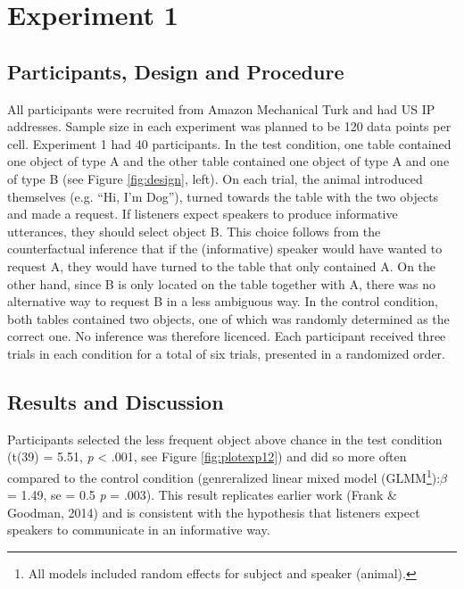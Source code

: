 \documentclass[10pt, letterpaper]{article}
\begin{document}
\section{Experiment 1}\label{experiment-1}

\subsection{Participants, Design and
Procedure}\label{participants-design-and-procedure}

All participants were recruited from Amazon Mechanical Turk and had US
IP addresses. Sample size in each experiment was planned to be 120 data
points per cell. Experiment 1 had 40 participants. In the test
condition, one table contained one object of type A and the other table
contained one object of type A and one of type B (see Figure
\ref{fig:design}, left). On each trial, the animal introduced themselves
(e.g. ``Hi, I'm Dog''), turned towards the table with the two objects
and made a request. If listeners expect speakers to produce informative
utterances, they should select object B. This choice follows from the
counterfactual inference that if the (informative) speaker would have
wanted to request A, they would have turned to the table that only
contained A. On the other hand, since B is only located on the table
together with A, there was no alternative way to request B in a less
ambiguous way. In the control condition, both tables contained two
objects, one of which was randomly determined as the correct one. No
inference was therefore licenced. Each participant received three trials
in each condition for a total of six trials, presented in a randomized
order.

\subsection{Results and Discussion}\label{results-and-discussion}

Participants selected the less frequent object above chance in the test
condition (t(39) = 5.51, \emph{p} \textless{} .001, see Figure
\ref{fig:plotexp12}) and did so more often compared to the control
condition (genreralized linear mixed model
(GLMM\footnote{All models included random effects for subject and speaker (animal).}):\emph{\(\beta\)}
= 1.49, se = 0.5 \emph{p} = .003). This result replicates earlier work
(Frank \& Goodman, 2014) and is consistent with the hypothesis that
listeners expect speakers to communicate in an informative way.
\end{document}
